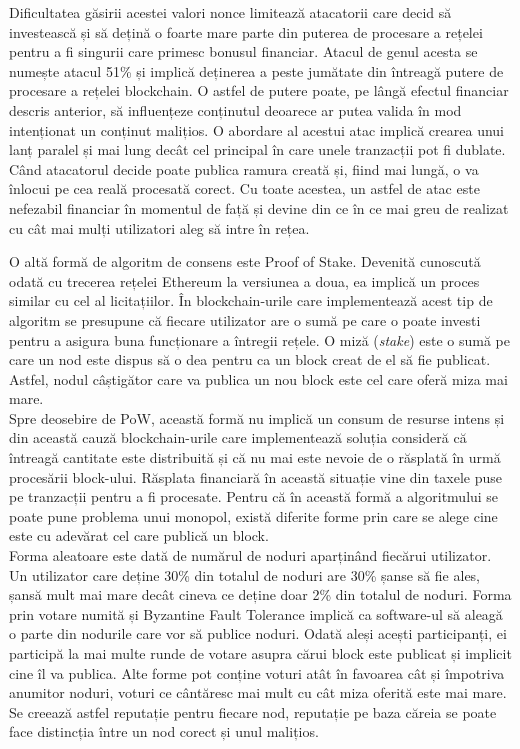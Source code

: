 Dificultatea găsirii acestei valori nonce limitează atacatorii care decid să investească și să dețină o foarte mare parte din puterea de procesare a rețelei pentru a fi singurii care primesc bonusul financiar. Atacul de genul acesta se numește atacul 51\% și implică deținerea a peste jumătate din întreagă putere de procesare a rețelei blockchain. O astfel de putere poate, pe lângă efectul financiar descris anterior, să influențeze conținutul deoarece ar putea valida în mod intenționat un conținut malițios. O abordare al acestui atac implică crearea unui lanț paralel și mai lung decât cel principal în care unele tranzacții pot fi dublate. Când atacatorul decide poate publica ramura creată și, fiind mai lungă, o va înlocui pe cea reală procesată corect. Cu toate acestea, un astfel de atac este nefezabil financiar în momentul de față și devine din ce în ce mai greu de realizat cu cât mai mulți utilizatori aleg să intre în rețea.\\

\clearpage

O altă formă de algoritm de consens este Proof of Stake. Devenită cunoscută odată cu trecerea rețelei Ethereum la versiunea a doua, ea implică un proces similar cu cel al licitațiilor. În blockchain-urile care implementează acest tip de algoritm se presupune că fiecare utilizator are o sumă pe care o poate investi pentru a asigura buna funcționare a întregii rețele. O miză (\textit{stake}) este o sumă pe care un nod este dispus să o dea pentru ca un block creat de el să fie publicat. Astfel, nodul câștigător care va publica un nou block este cel care oferă miza mai mare.\\

Spre deosebire de PoW, această formă nu implică un consum de resurse intens și din această cauză blockchain-urile care implementează soluția consideră că întreagă cantitate este distribuită și că nu mai este nevoie de o răsplată în urmă procesării block-ului. Răsplata financiară în această situație vine din taxele puse pe tranzacții pentru a fi procesate. Pentru că în această formă a algoritmului se poate pune problema unui monopol, există diferite forme prin care se alege cine este cu adevărat cel care publică un block.\\

Forma aleatoare este dată de numărul de noduri aparținând fiecărui utilizator. Un utilizator care deține 30\% din totalul de noduri are 30\% șanse să fie ales, șansă mult mai mare decât cineva ce deține doar 2\% din totalul de noduri. Forma prin votare numită și Byzantine Fault Tolerance implică ca software-ul să aleagă o parte din nodurile care vor să publice noduri. Odată aleși acești participanți, ei participă la mai multe runde de votare asupra cărui block este publicat și implicit cine îl va publica. Alte forme pot conține voturi atât în favoarea cât și împotriva anumitor noduri, voturi ce cântăresc mai mult cu cât miza oferită este mai mare. Se creează astfel reputație pentru fiecare nod, reputație pe baza căreia se poate face distincția între un nod corect și unul malițios.\\


